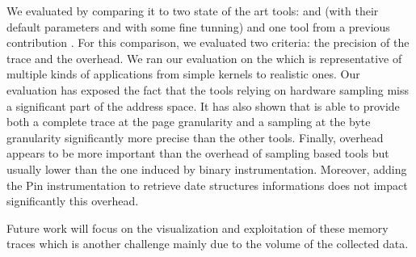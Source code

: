 We evaluated \Moca by comparing it to two state of the art tools: \Mitos and
\MemProf (with their default parameters and with some fine tunning) and one
tool from a previous contribution \TABARNAC. For this comparison, we evaluated
two criteria: the precision of the trace and the overhead. We ran our
evaluation on the \NPB which is representative of multiple kinds of applications from simple kernels
to realistic ones. Our evaluation has exposed the fact that the tools
relying on hardware sampling miss a significant part of the address space. It
has also shown that \Moca is able to provide both a complete trace at the page
granularity and a sampling at the byte granularity significantly more precise than the
other tools. Finally, \Moca overhead appears to be more important than the overhead of sampling
based tools but usually lower than the one induced by binary instrumentation.
Moreover, adding the Pin instrumentation to retrieve date structures
informations does not impact significantly this overhead.

Future work will focus on the visualization and exploitation of these memory traces
which is another challenge mainly due to the volume of the collected data.
